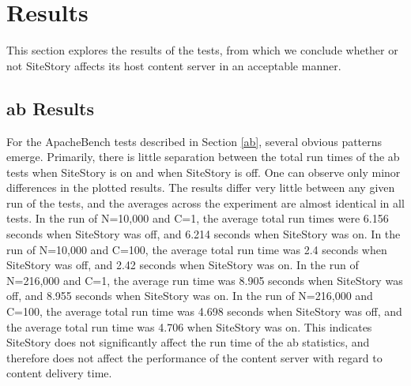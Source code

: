 \documentclass[runningheads,a4paper]{llncs}
\begin{document}



\section{Results}
\label{results}
\vskip -3mm
This section explores the results of the tests, from which we conclude whether or not SiteStory affects its host content server in an acceptable manner. 

\subsection{ab Results}
\label{abresults}
\vskip -3mm
For the ApacheBench tests described in Section \ref{ab}, several obvious patterns emerge. Primarily, there is little separation between the total run times of the ab tests when SiteStory is on and when SiteStory is off. One can observe only minor differences in the plotted results. The results differ very little between any given run of the tests, and the averages across the experiment are almost identical in all tests. In the run of N=10,000 and C=1, the average total run times were 6.156 seconds when SiteStory was off, and 6.214 seconds when SiteStory was on.  In the run of N=10,000  and C=100, the average total run time was 2.4 seconds when SiteStory was off, and 2.42 seconds when SiteStory was on. In the run of N=216,000 and C=1, the average run time was 8.905 seconds when SiteStory was off, and 8.955 seconds when SiteStory was on. In the run of N=216,000 and C=100, the average total run time was 4.698 seconds when SiteStory was off, and the average total run time was 4.706 when SiteStory was on. This indicates SiteStory does not significantly affect the run time of the ab statistics, and therefore does not affect the performance of the content server with regard to content delivery time. 
\end{document}
